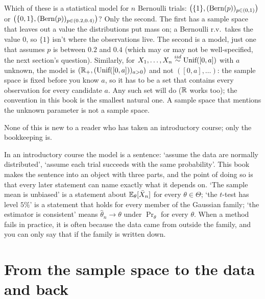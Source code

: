 \begin{pitfall}
Which of these is a statistical model for $n$ Bernoulli trials: $\left( \{1\}, (\text{Bern}(p))_{p \in (0,1)} \right)$ or $\left( \{0,1\}, (\text{Bern}(p))_{p \in (0.2, 0.4)} \right)$?
Only the second.
The first has a sample space that leaves out a value the distributions put mass on; a Bernoulli r.v.\ takes the value $0$, so $\{1\}$ isn't where the observations live.
The second is a model, just one that assumes $p$ is between $0.2$ and $0.4$ (which may or may not be well-specified, the next section's question).
Similarly, for $X_1, \ldots, X_n \stackrel{iid}{\sim} \text{Unif}([0, a])$ with $a$ unknown, the model is $\left( \mathbb{R}_+, (\text{Unif}([0, a]))_{a > 0} \right)$ and not $\left( [0, a], \ldots \right)$: the sample space is fixed before you know $a$, so it has to be a set that contains every observation for every candidate $a$.
Any such set will do ($\mathbb{R}$ works too); the convention in this book is the smallest natural one.
A sample space that mentions the unknown parameter is not a sample space.
\end{pitfall}

None of this is new to a reader who has taken an introductory course; only the bookkeeping is.

\begin{bridge}
In an introductory course the model is a sentence: `assume the data are normally distributed', `assume each trial succeeds with the same probability'.
This book makes the sentence into an object with three parts, and the point of doing so is that every later statement can name exactly what it depends on.
`The sample mean is unbiased' is a statement about $\operatorname*{\mathbb{E}}_\theta[\bar{X}_n]$ for every $\theta \in \Theta$; `the $t$-test has level $5\%$' is a statement that holds for every member of the Gaussian family; `the estimator is consistent' means $\hat{\theta}_n \to \theta$ under $\Pr_\theta$ for every $\theta$.
When a method fails in practice, it is often because the data came from outside the family, and you can only say that if the family is written down.
\end{bridge}

\section{From the sample space to the data and back}
\label{sec:models-sample-space}


